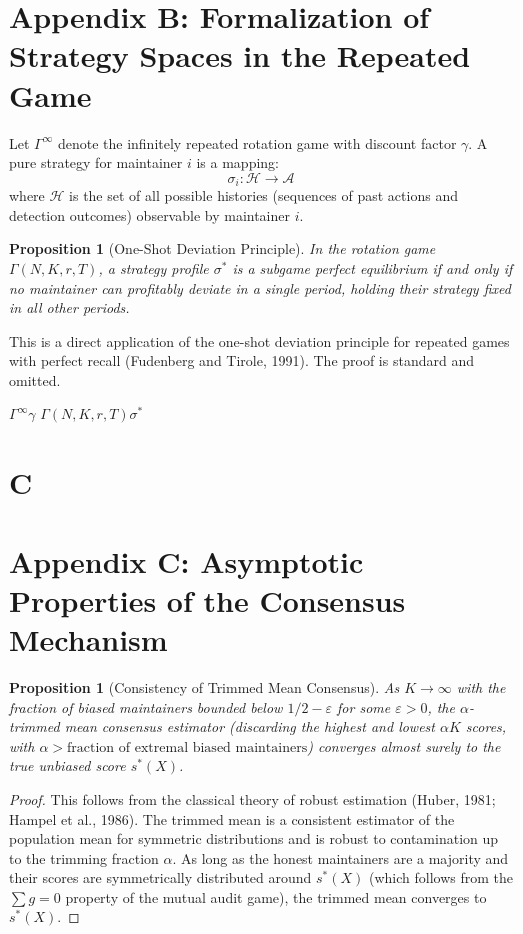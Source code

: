 \documentclass[12pt,a4paper]{article}
\newtheorem{proposition}[theorem]{Proposition}
\theoremstyle{remark}
\begin{document}
\section{Appendix B: Formalization of Strategy Spaces in the Repeated Game}

Let $\Gamma^\infty$ denote the infinitely repeated rotation game with discount
factor $\gamma$. A pure strategy for maintainer $i$ is a mapping:
\begin{equation}
    \sigma_i: \mathcal{H} \to \mathcal{A}
\end{equation}
where $\mathcal{H}$ is the set of all possible histories (sequences of past
actions and detection outcomes) observable by maintainer $i$.

\begin{proposition}[One-Shot Deviation Principle]\label{prop:one_shot}
In the rotation game $\Gamma(N, K, r, T)$, a strategy profile $\sigma^*$ is a
subgame perfect equilibrium if and only if no maintainer can profitably deviate
in a single period, holding their strategy fixed in all other periods.
\end{proposition}

This is a direct application of the one-shot deviation principle for repeated
games with perfect recall (Fudenberg and Tirole, 1991). The proof is standard
and omitted.

\noindent\textbf{}
$\Gamma^\infty$$\gamma$
$\Gamma(N, K, r, T)$$\sigma^*$


\section{C}
\section{Appendix C: Asymptotic Properties of the Consensus Mechanism}

\begin{proposition}[Consistency of Trimmed Mean Consensus]\label{prop:consistency}
As $K \to \infty$ with the fraction of biased maintainers bounded below
$1/2 - \varepsilon$ for some $\varepsilon > 0$, the $\alpha$-trimmed mean
consensus estimator (discarding the highest and lowest $\alpha K$ scores,
with $\alpha > \text{fraction of extremal biased maintainers}$) converges
almost surely to the true unbiased score $s^*(X)$.
\end{proposition}

\begin{proof}
This follows from the classical theory of robust estimation (Huber, 1981;
Hampel et al., 1986). The trimmed mean is a consistent estimator of the
population mean for symmetric distributions and is robust to contamination
up to the trimming fraction $\alpha$. As long as the honest maintainers are
a majority and their scores are symmetrically distributed around $s^*(X)$
(which follows from the $\sum g = 0$ property of the mutual audit game),
the trimmed mean converges to $s^*(X)$.
\end{proof}
\end{document}
